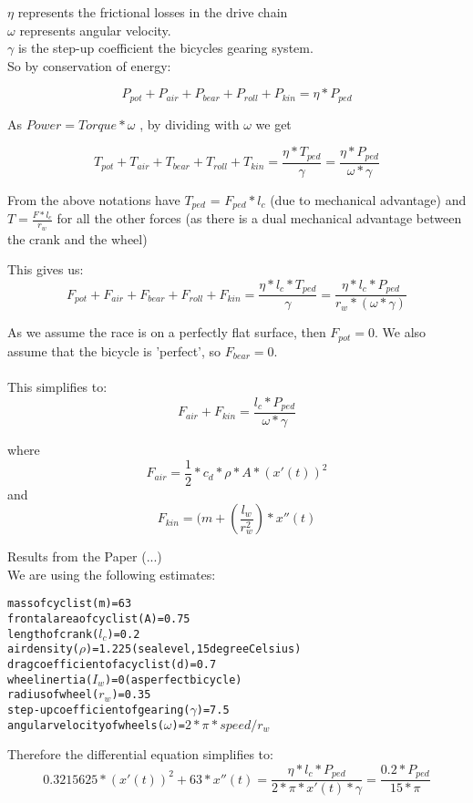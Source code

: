 \documentclass[10pt, a4paper]{report}
\begin{document}
$\eta$ 		represents the frictional losses in the drive chain \\
$\omega$ 	represents angular velocity.\\
$\gamma$	is the step-up coefficient the bicycles gearing system.  \\
\newpage
So by conservation of energy:

$$P_{pot} + P_{air} + P_{bear} + P_{roll} + P_{kin} = \eta * P_{ped}$$

As $Power = Torque * \omega$ , by dividing with $\omega$ we get

$$ T_{pot} + T_{air} + T_{bear} + T_{roll} + T_{kin} = \frac{ \eta * T_{ped} }{ \gamma }  = \frac{\eta * P_{ped}}{\omega * \gamma} $$

From the above notations have $T_{ped}$ = $F_{ped} * l_{c}$ (due to mechanical advantage) and $T = \frac{F * l_{c}}{r_{w}}$ for all the other forces (as there is a dual mechanical advantage between the crank and the wheel)

This gives us: $$ F_{pot} + F_{air} + F_{bear} + F_{roll} + F_{kin}
	= \frac{ \eta * l_{c} * T_{ped} }{ \gamma }
	= \frac{ \eta * l_{c} * P_{ped} }{ r_{w} * (\omega * \gamma)} $$

As we assume the race is on a perfectly flat surface, then $F_{pot} = 0$. We also assume that the bicycle is 'perfect', so $F_{bear} = 0$. \\\\
This simplifies to: $$F_{air} + F_{kin} = \frac{l_{c} * P_{ped} }{ \omega * \gamma } $$

where $$ F_{air} 	= \frac{1}{2} * c_{d} * \rho * A * ( x'(t) )^{2} $$
and	  $$ F_{kin} 	= ( m + ( \frac{l_w}{r_w^{2}} ) * x''(t) $$

Results from the Paper (...)\\

We are using the following estimates:

\begin{alltt}
mass of cyclist (m) 				= 63
frontal area of cyclist (A) 		= 0.75
length of crank (\(l_{c}\)) 		= 0.2
air density (\(\rho\)) 				= 1.225 (sea level, 15 degree Celsius)
drag coefficient of a cyclist (d) 	= 0.7
wheel inertia (\(I_w\)) = 0 (as perfect bicycle)
radius of wheel (\(r_w\)) = 0.35
step-up coefficient of gearing (\(\gamma\)) = 7.5
angular velocity of wheels (\(\omega\)) = \(2 * \pi * speed / {r_{w}} \)
\end{alltt}

Therefore the differential equation simplifies to:
$$ 0.3215625 * (x'(t))^{2} + 63 * x''(t)
	= \frac{\eta * l_{c} * P_{ped}} {2 * \pi * x'(t) * \gamma }
	= \frac {0.2 * P_{ped}} {15 * \pi} $$
\end{document}
